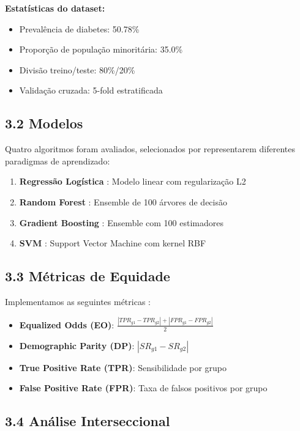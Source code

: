 \documentclass[12pt,a4paper]{article}
\begin{document}
\textbf{Estatísticas do dataset:}
\begin{itemize}
    \item Prevalência de diabetes: 50.78\%
    \item Proporção de população minoritária: 35.0\%
    \item Divisão treino/teste: 80\%/20\%
    \item Validação cruzada: 5-fold estratificada
\end{itemize}

\subsection{3.2 Modelos}

Quatro algoritmos foram avaliados, selecionados por representarem diferentes 
paradigmas de aprendizado:

\begin{enumerate}
    \item \textbf{Regressão Logística} \cite{cox1958}: Modelo linear com 
          regularização L2
    \item \textbf{Random Forest} \cite{breiman2001}: Ensemble de 100 árvores 
          de decisão
    \item \textbf{Gradient Boosting} \cite{friedman2001}: Ensemble com 100 
          estimadores
    \item \textbf{SVM} \cite{vapnik1995}: Support Vector Machine com kernel RBF
\end{enumerate}

\subsection{3.3 Métricas de Equidade}

Implementamos as seguintes métricas \cite{corbett2018}:

\begin{itemize}
    \item \textbf{Equalized Odds (EO)}: 
          $\frac{|TPR_{g1} - TPR_{g2}| + |FPR_{g1} - FPR_{g2}|}{2}$
    \item \textbf{Demographic Parity (DP)}: 
          $|SR_{g1} - SR_{g2}|$
    \item \textbf{True Positive Rate (TPR)}: Sensibilidade por grupo
    \item \textbf{False Positive Rate (FPR)}: Taxa de falsos positivos por grupo
\end{itemize}

\subsection{3.4 Análise Interseccional}
\end{document}
